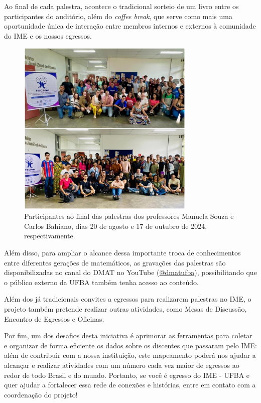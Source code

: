 \documentclass{hipatia}
\begin{document}
Ao final de cada palestra, acontece o tradicional sorteio de um livro entre os participantes do auditório, além do \textit{coffee break}, que serve como mais uma oportunidade única de interação entre membros internos e externos à comunidade do IME e os nossos egressos.

\begin{figure}[htb]
    \centering
    \includegraphics[width=8.5cm]{pecmat2.jpeg}
    \caption{Participantes ao final das palestras dos professores Manuela Souza e Carlos Bahiano, dias 20 de agosto e 17 de outubro de 2024, respectivamente.}
 \label{PECMat2}
\end{figure}

Além disso, para ampliar o alcance dessa importante troca de conhecimentos entre diferentes gerações de matemáticos, as gravações das palestras são disponibilizadas no canal do DMAT no YouTube (\href{http://www.youtube.com/@dmatufba}{@dmatufba}), possibilitando que o público externo da UFBA também tenha acesso ao conteúdo.

Além dos já tradicionais convites a egressos para realizarem palestras no IME, o projeto também pretende realizar outras atividades, como Mesas de Discussão, Encontro de Egressos e Oficinas.
 
Por fim, um dos desafios desta iniciativa é aprimorar as ferramentas para coletar e organizar de forma eficiente os dados sobre os discentes que passaram pelo IME: além de contribuir com a nossa instituição, este mapeamento poderá nos ajudar a alcançar e realizar atividades com um número cada vez maior de egressos ao redor de todo Brasil e do mundo. Portanto, se você é egresso do IME - UFBA e quer ajudar a fortalecer essa rede de conexões e histórias, entre em contato com a coordenação do projeto!
\end{document}
